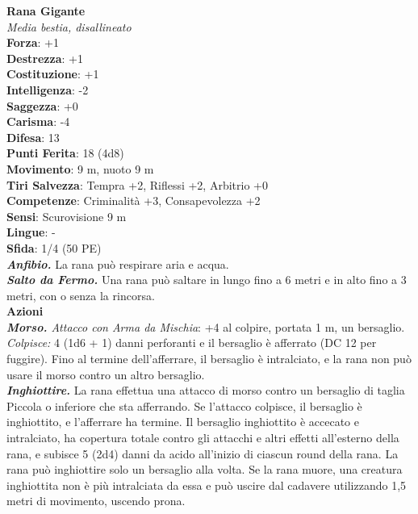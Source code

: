 \begin{multicols}{2}
\medskip\textbf{Rana Gigante}\\
\emph{Media bestia, disallineato}\\
\textbf{Forza}: +1\\
\textbf{Destrezza}: +1\\
\textbf{Costituzione}: +1\\
\textbf{Intelligenza}: -2\\
\textbf{Saggezza}: +0\\
\textbf{Carisma}: -4\\
\textbf{Difesa}: 13\\
\textbf{Punti Ferita}: 18 (4d8)\\
\textbf{Movimento}: 9 m, nuoto 9 m\\
\textbf{Tiri Salvezza}: Tempra +2, Riflessi +2, Arbitrio +0 \\
\textbf{Competenze}: Criminalità +3, Consapevolezza +2\\
\textbf{Sensi}: Scurovisione 9 m\\
\textbf{Lingue}: -\\
\textbf{Sfida}: 1/4 (50 PE)\smallskip\\
\emph{\textbf{Anfibio.}} La rana può respirare aria e acqua.\\
\emph{\textbf{Salto da Fermo.}} Una rana può saltare in lungo fino a 6 metri e in alto fino a 3 metri, con o senza la rincorsa.\\
\smallskip\textbf{Azioni}\\
\emph{\textbf{Morso.} Attacco con Arma da Mischia}: +4 al colpire, portata 1 m, un bersaglio.\\
\emph{Colpisce:} 4 (1d6 + 1) danni perforanti e il bersaglio è afferrato (DC  12 per fuggire). Fino al termine dell'afferrare, il bersaglio è intralciato, e la rana non può usare il morso contro un altro bersaglio.\\
\emph{\textbf{Inghiottire.}} La rana effettua una attacco di morso contro un bersaglio di taglia Piccola o inferiore che sta afferrando. Se l'attacco colpisce, il bersaglio è inghiottito, e l'afferrare ha termine. Il bersaglio inghiottito è accecato e intralciato, ha copertura totale contro gli attacchi e altri effetti all'esterno della rana, e subisce 5 (2d4) danni da acido all'inizio di ciascun round della rana. La rana può inghiottire solo un bersaglio alla volta. Se la rana muore, una creatura inghiottita non è più intralciata da essa e può uscire dal cadavere utilizzando 1,5 metri di movimento, uscendo prona.\\


\end{multicols}
